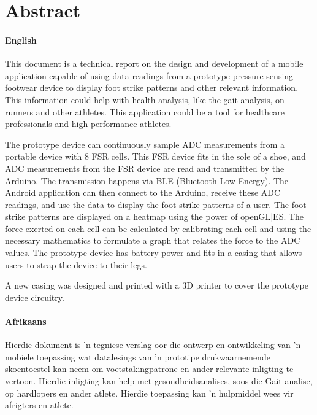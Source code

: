 \chapter*{Abstract}
\makeatletter{}\makeatother

\subsubsection*{English}

This document is a technical report on the design and development of a mobile application capable of using data readings from a prototype pressure-sensing footwear device to display foot strike patterns and other relevant information. This information could help with health analysis, like the gait analysis, on runners and other athletes. This application could be a tool for healthcare professionals and high-performance athletes.

The prototype device can continuously sample ADC measurements from a portable device with 8 FSR cells. This FSR device fits in the sole of a shoe, and ADC measurements from the FSR device are read and transmitted by the Arduino. The transmission happens via BLE (Bluetooth Low Energy). The Android application can then connect to the Arduino, receive these ADC readings, and use the data to display the foot strike patterns of a user. The foot strike patterns are displayed on a heatmap using the power of openGL|ES. The force exerted on each cell can be calculated by calibrating each cell and using the necessary mathematics to formulate a graph that relates the force to the ADC values. The prototype device has battery power and fits in a casing that allows users to strap the device to their legs.

A new casing was designed and printed with a 3D printer to cover the prototype device circuitry.
\clearpage
\subsubsection*{Afrikaans}

Hierdie dokument is 'n tegniese verslag oor die ontwerp en ontwikkeling van 'n mobiele toepassing wat datalesings van 'n prototipe drukwaarnemende skoentoestel kan neem om voetstakingpatrone en ander relevante inligting te vertoon. Hierdie inligting kan help met gesondheidsanalises, soos die Gait analise, op hardlopers en ander atlete. Hierdie toepassing kan 'n hulpmiddel wees vir afrigters en atlete.


